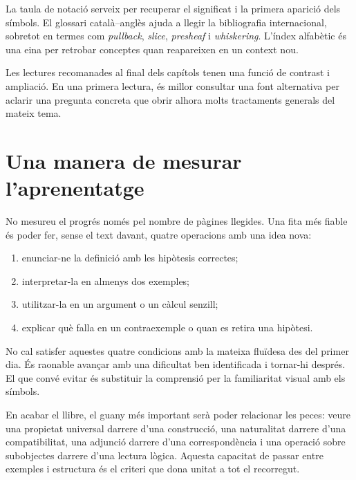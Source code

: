 La taula de notació serveix per recuperar el significat
i la primera aparició dels símbols. El glossari
català--anglès ajuda a llegir la bibliografia internacional,
sobretot en termes com \emph{pullback}, \emph{slice},
\emph{presheaf} i \emph{whiskering}. L'índex alfabètic
és una eina per retrobar conceptes quan reapareixen en
un context nou.

Les lectures recomanades al final dels capítols tenen
una funció de contrast i ampliació. En una primera
lectura, és millor consultar una font alternativa per
aclarir una pregunta concreta que obrir alhora molts
tractaments generals del mateix tema.

\section{Una manera de mesurar l'aprenentatge}

No mesureu el progrés només pel nombre de pàgines llegides.
Una fita més fiable és poder fer, sense el text davant,
quatre operacions amb una idea nova:
\begin{enumerate}
  \item enunciar-ne la definició amb les hipòtesis correctes;
  \item interpretar-la en almenys dos exemples;
  \item utilitzar-la en un argument o un càlcul senzill;
  \item explicar què falla en un contraexemple o quan
        es retira una hipòtesi.
\end{enumerate}

No cal satisfer aquestes quatre condicions amb la mateixa
fluïdesa des del primer dia. És raonable avançar amb
una dificultat ben identificada i tornar-hi després.
El que convé evitar és substituir la comprensió per
la familiaritat visual amb els símbols.

En acabar el llibre, el guany més important serà poder
relacionar les peces: veure una propietat universal
darrere d'una construcció, una naturalitat darrere
d'una compatibilitat, una adjunció darrere d'una
correspondència i una operació sobre subobjectes
darrere d'una lectura lògica. Aquesta capacitat de
passar entre exemples i estructura és el criteri
que dona unitat a tot el recorregut.

\endgroup
